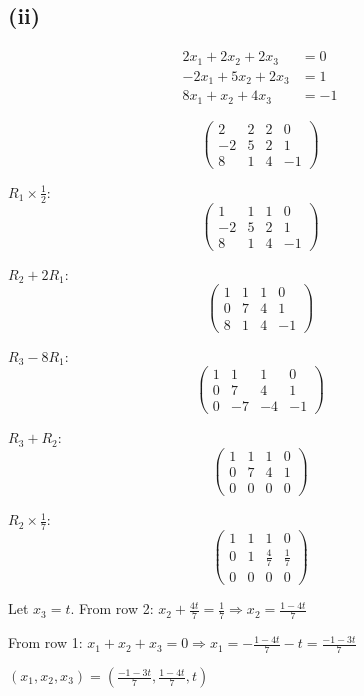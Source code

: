 \subsection*{(ii)}
\begin{align*}
	2x_1 + 2x_2 + 2x_3  & = 0  \\
	-2x_1 + 5x_2 + 2x_3 & = 1  \\
	8x_1 + x_2 + 4x_3   & = -1
\end{align*}

\[
	\left(\begin{array}{ccc|c}
			2  & 2 & 2 & 0  \\
			-2 & 5 & 2 & 1  \\
			8  & 1 & 4 & -1
		\end{array}\right)
\]

$R_1 \times \frac{1}{2}$:
\[
	\left(\begin{array}{ccc|c}
			1  & 1 & 1 & 0  \\
			-2 & 5 & 2 & 1  \\
			8  & 1 & 4 & -1
		\end{array}\right)
\]

$R_2 + 2R_1$:
\[
	\left(\begin{array}{ccc|c}
			1 & 1  & 1  & 0  \\
			0 & 7  & 4  & 1  \\
			8  & 1 & 4 & -1
		\end{array}\right)
\]

$R_3 - 8R_1$:
\[
	\left(\begin{array}{ccc|c}
			1 & 1  & 1  & 0  \\
			0 & 7  & 4  & 1  \\
			0 & -7 & -4 & -1
		\end{array}\right)
\]

$R_3 + R_2$:
\[
	\left(\begin{array}{ccc|c}
			1 & 1 & 1 & 0 \\
			0 & 7 & 4 & 1 \\
			0 & 0 & 0 & 0
		\end{array}\right)
\]

$R_2 \times \frac{1}{7}$:
\[
	\left(\begin{array}{ccc|c}
			1 & 1 & 1           & 0           \\
			0 & 1 & \frac{4}{7} & \frac{1}{7} \\
			0 & 0 & 0           & 0
		\end{array}\right)
\]

Let $x_3 = t$. From row 2: $x_2 + \frac{4t}{7} = \frac{1}{7} \Rightarrow x_2 = \frac{1-4t}{7}$

From row 1: $x_1 + x_2 + x_3 = 0 \Rightarrow x_1 = -\frac{1-4t}{7} - t = \frac{-1-3t}{7}$

$\boxed{(x_1, x_2, x_3) = \left(\frac{-1-3t}{7}, \frac{1-4t}{7}, t\right)}$
